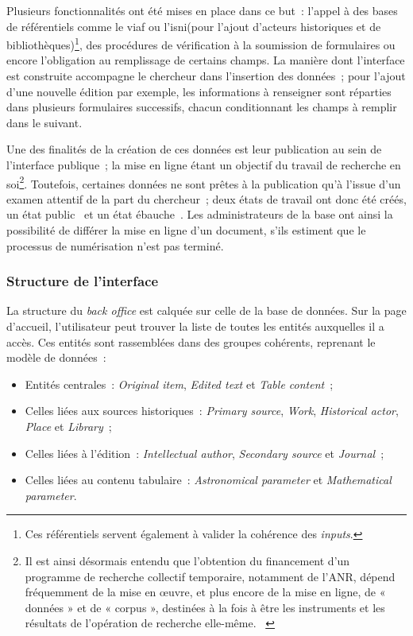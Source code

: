 \documentclass[a4paper,12pt,twoside]{book}
\newcommand{\eng}{\emph}
\newcommand{\Oi}{\eng{Original item}\xspace}
\newcommand{\bdd}{base de données\xspace}
\newcommand{\g}[1]{\og#1~\fg}
\newcommand{\viaf}{\gls{viaf}\xspace}
\newcommand{\isni}{\gls{isni}\xspace}
\begin{document}
Plusieurs fonctionnalités ont été mises en place dans ce but~: l'appel à des bases de référentiels comme le \viaf ou l'\isni (pour l'ajout d'acteurs historiques et de bibliothèques)\footnote{Ces référentiels servent également à valider la cohérence des \eng{inputs}.}, des procédures de vérification à la soumission de formulaires ou encore l'obligation au remplissage de certains champs. La manière dont l'interface est construite accompagne le chercheur dans l'insertion des données~; pour l'ajout d'une nouvelle édition par exemple, les informations à renseigner sont réparties dans plusieurs formulaires successifs, chacun conditionnant les champs à remplir dans le suivant.

Une des finalités de la création de ces données est leur publication au sein de l'interface publique~; la mise en ligne étant un objectif du travail de recherche en soi\footnote{\g{Il est ainsi désormais entendu que l’obtention du financement d’un programme de recherche collectif temporaire, notamment de l’ANR, dépend fréquemment de la mise en œuvre, et plus encore de la mise en ligne, de « données » et de « corpus », destinées à la fois à être les instruments et les résultats de l’opération de recherche elle-même.} \cite[§~2]{potinInstitutionsPratiquesArchives2011}}. Toutefois, certaines données ne sont prêtes à la publication qu'à l'issue d'un examen attentif de la part du chercheur~; deux états de travail ont donc été créés, un état \g{public} et un état \g{ébauche}. Les administrateurs de la base ont ainsi la possibilité de différer la mise en ligne d'un document, s'ils estiment que le processus de numérisation n'est pas terminé.

			\subsubsection{Structure de l'interface}
La structure du \eng{back office} est calquée sur celle de la \bdd. Sur la page d'accueil, l'utilisateur peut trouver la liste de toutes les entités auxquelles il a accès. Ces entités sont rassemblées dans des groupes cohérents, reprenant le modèle de données~:

\begin{itemize}
	\item Entités centrales~: \Oi, \eng{Edited text} et \eng{Table content}~;
	\item Celles liées aux sources historiques~: \eng{Primary source}, \eng{Work}, \eng{Historical actor}, \eng{Place} et \eng{Library}~;
	\item Celles liées à l'édition~: \eng{Intellectual author}, \eng{Secondary source} et \eng{Journal}~;
	\item Celles liées au contenu tabulaire~: \eng{Astronomical parameter} et \eng{Mathematical parameter}.
\end{itemize}
\end{document}
